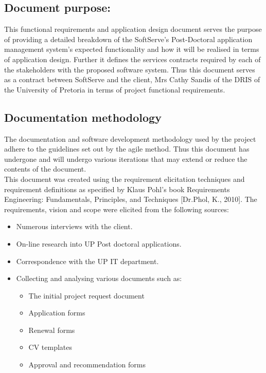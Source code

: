 \documentclass[12pt]{article}
\begin{document}
\subsection{Document purpose:}
\vspace{0.2in}
This functional requirements and application design document serves the purpose of providing a detailed breakdown of the SoftServe's Post-Doctoral application management system's expected functionality and how it will be realised in terms of application design. Further it defines the services contracts required by each of the stakeholders with the proposed software system. Thus this document serves as a contract between SoftServe and the client, Mrs Cathy Sandis of the DRIS of the University of Pretoria in terms of project functional requirements.

\vspace{0.2in}

\subsection{Documentation methodology}
\vspace{0.2in}
\begin{flushleft}
The documentation and software development methodology used by the project adhere to the guidelines set out by the agile method. Thus this document has undergone and will undergo various iterations that may extend or reduce the contents of the document.\\

This document was created using the requirement elicitation techniques and requirement definitions as specified by Klaus Pohl’s book Requirements Engineering: Fundamentals, Principles, and Techniques [Dr.Phol, K., 2010].
The requirements, vision and scope were elicited from the following sources:
\begin{itemize}
	\item Numerous interviews with the client.
	\item On-line research into UP Post doctoral applications.
	\item Correspondence with the UP IT department.
	\item Collecting and analysing various documents such as:
		\begin{itemize}
			\item The initial project request document
			\item Application forms
			\item Renewal forms
			\item CV templates
			\item Approval and recommendation forms
		\end{itemize}
\end{itemize}
\end{flushleft}	
\end{document}

